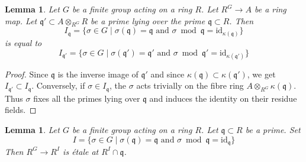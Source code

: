 \documentclass{stacks-project}
\theoremstyle{plain}
\newtheorem{lemma}[subsection]{Lemma}
\theoremstyle{definition}
\theoremstyle{remark}
\numberwithin{equation}{subsection}
\begin{document}
\begin{lemma}
\label{lemma-inertia-base-change}
Let $G$ be a finite group acting on a ring $R$. Let $R^G \to A$ be a ring
map. Let $\mathfrak q' \subset A \otimes_{R^G} R$ be a prime lying
over the prime $\mathfrak q \subset R$. Then
$$
I_\mathfrak q = \{\sigma \in G \mid
\sigma(\mathfrak q) = \mathfrak q\text{ and }
\sigma \bmod \mathfrak q = \text{id}_{\kappa(\mathfrak q)}\}
$$
is equal to
$$
I_{\mathfrak q'} = \{\sigma \in G \mid
\sigma(\mathfrak q') = \mathfrak q'\text{ and }
\sigma \bmod \mathfrak q' = \text{id}_{\kappa(\mathfrak q')}\}
$$
\end{lemma}

\begin{proof}
Since $\mathfrak q$ is the inverse image of $\mathfrak q'$
and since $\kappa(\mathfrak q) \subset \kappa(\mathfrak q')$,
we get $I_{\mathfrak q'} \subset I_\mathfrak q$.
Conversely, if $\sigma \in I_\mathfrak q$, the $\sigma$
acts trivially on the fibre ring $A \otimes_{R^G} \kappa(\mathfrak q)$.
Thus $\sigma$ fixes all the primes lying over $\mathfrak q$
and induces the identity on their residue fields.
\end{proof}

\begin{lemma}
\label{lemma-inertia-invariants-etale}
Let $G$ be a finite group acting on a ring $R$. Let $\mathfrak q \subset R$
be a prime. Set
$$
I = \{\sigma \in G \mid \sigma(\mathfrak q) = \mathfrak q
\text{ and } \sigma \bmod \mathfrak q = \text{id}_\mathfrak q\}
$$
Then $R^G \to R^I$ is \'etale at $R^I \cap \mathfrak q$.
\end{lemma}
\end{document}
